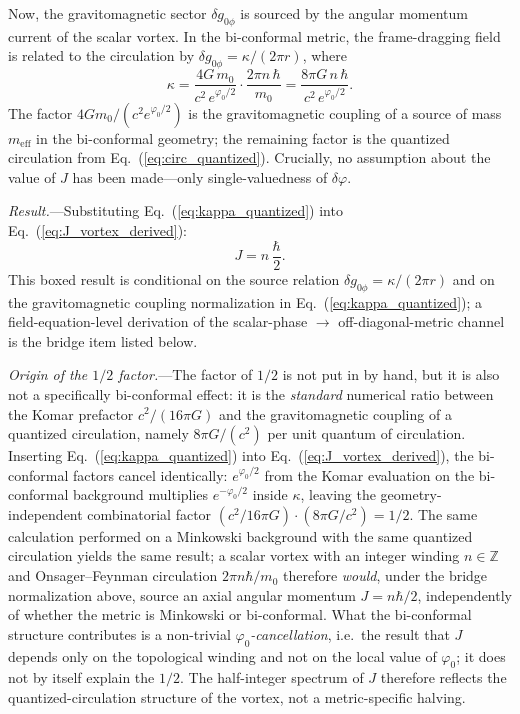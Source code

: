 \documentclass[aps,prd,onecolumn,superscriptaddress,nofootinbib,showpacs,12pt,notitlepage]{revtex4-2}
\newcommand{\meff}{m_{\mathrm{eff}}}
\begin{document}
Now, the gravitomagnetic sector $\delta g_{0\phi}$ is
sourced by the angular momentum current of the scalar
vortex.  In the bi-conformal metric, the frame-dragging
field is related to the circulation by
$\delta g_{0\phi} = \kappa/(2\pi r)$, where
\begin{equation}\label{eq:kappa_quantized}
  \kappa
  = \frac{4G\,m_{0}}{c^{2}\,e^{\varphi_{0}/2}}
    \cdot \frac{2\pi n\,\hbar}{m_{0}}
  = \frac{8\pi G\,n\,\hbar}{c^{2}\,e^{\varphi_{0}/2}}.
\end{equation}
The factor $4Gm_{0}/(c^{2}e^{\varphi_{0}/2})$ is the
gravitomagnetic coupling of a source of mass $\meff$
in the bi-conformal geometry; the remaining factor is
the quantized circulation from
Eq.~(\ref{eq:circ_quantized}).  Crucially, no assumption
about the value of $J$ has been made---only single-valuedness
of $\delta\varphi$.

\textit{Result.}---Substituting Eq.~(\ref{eq:kappa_quantized})
into Eq.~(\ref{eq:J_vortex_derived}):
\begin{equation}\label{eq:J_vortex}
  \boxed{J = n\,\frac{\hbar}{2}.}
\end{equation}
This boxed result is conditional on the source relation
$\delta g_{0\phi}=\kappa/(2\pi r)$ and on the
gravitomagnetic coupling normalization in
Eq.~(\ref{eq:kappa_quantized}); a field-equation-level
derivation of the scalar-phase $\to$ off-diagonal-metric
channel is the bridge item listed below.

\textit{Origin of the $1/2$ factor.}---The factor of
$1/2$ is not put in by hand, but it is also not a
specifically bi-conformal effect: it is the
\emph{standard} numerical ratio between the Komar
prefactor $c^{2}/(16\pi G)$ and the gravitomagnetic
coupling of a quantized circulation, namely
$8\pi G/(c^{2})$ per unit quantum of circulation.
Inserting Eq.~(\ref{eq:kappa_quantized}) into
Eq.~(\ref{eq:J_vortex_derived}), the bi-conformal
factors cancel identically:
$e^{\varphi_{0}/2}$ from the Komar evaluation on the
bi-conformal background multiplies $e^{-\varphi_{0}/2}$
inside $\kappa$, leaving the geometry-independent
combinatorial factor
$(c^{2}/16\pi G)\cdot(8\pi G/c^{2}) = 1/2$.
The same calculation performed on a Minkowski
background with the same quantized circulation yields
the same result; a scalar vortex with an integer
winding $n\in\mathbb Z$ and Onsager--Feynman
circulation $2\pi n\hbar/m_{0}$ therefore
\emph{would}, under the bridge normalization above,
source an axial angular momentum
$J = n\hbar/2$, independently of whether the metric is
Minkowski or bi-conformal.  What the bi-conformal
structure contributes is a non-trivial
\emph{$\varphi_{0}$-cancellation}, i.e.\ the result that
$J$ depends only on the topological winding and not on
the local value of $\varphi_{0}$; it does not by itself
explain the $1/2$.  The half-integer spectrum of $J$
therefore reflects the quantized-circulation structure
of the vortex, not a metric-specific halving.
\end{document}
